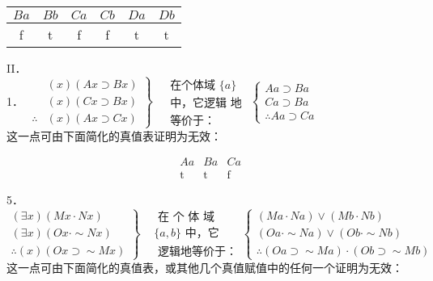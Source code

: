 \begin{center}
\begin{tabular}{cccccc}
$B a$ & $B b$ & $C a$ & $C b$ & $D a$ & $D b$ \\
\hline
f & t & f & f & t & t \\
\hline
\end{tabular}
\end{center}

II．\\
1． $\left.\begin{array}{rl} & (x)(A x \supset B x) \\ & (x)(C x \supset B x) \\ \therefore & (x)(A x \supset C x)\end{array}\right\} \begin{aligned} & \text { 在个体域 }\{a\} \\ & \text { 中，它逻辑 地 } \\ & \text { 等价于：}\end{aligned}\left\{\begin{array}{l}A a \supset B a \\ C a \supset B a \\ \therefore A a \supset C a\end{array}\right.$\\
这一点可由下面简化的真值表证明为无效：

$$
\begin{array}{ccc}
A a & B a & C a \\
\hline \mathrm{t} & \mathrm{t} & \mathrm{f}
\end{array}
$$

5． $\left.\begin{array}{rl}(\exists x)(M x \cdot N x) \\ (\exists x)(O x \cdot \sim N x) \\ \therefore(x)(O x \supset \sim M x)\end{array}\right\} \begin{aligned} & \text { 在 个 体 域 } \\ & \{a, b\} \text { 中，它 } \\ & \text { 逻辑地等价于：}\end{aligned}\left\{\begin{array}{l}(M a \cdot N a) \vee(M b \cdot N b) \\ (O a \cdot \sim N a) \vee(O b \cdot \sim N b) \\ \therefore(O a \supset \sim M a) \cdot(O b \supset \sim M b)\end{array}\right.$\\
这一点可由下面简化的真值表，或其他几个真值赋值中的任何一个证明为无效：

